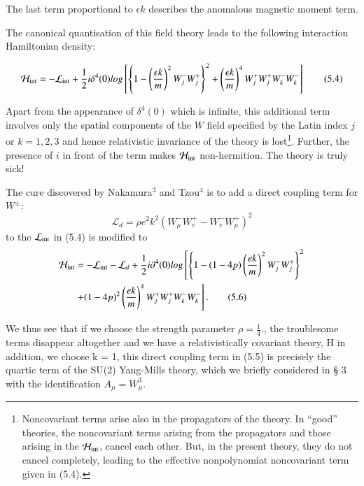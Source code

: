 The last term proportional to $\epsilon k$ describes the anomalous magnetic moment term. 

The canonical quantisation of this field theory leads to the following interaction Hamiltonian density: 

\begin{equation*}
\mathcal{H}_{\rm int} = -\mathcal{L}_{\rm int} + \frac{1}{2} i \delta^{4} (0) log\left[\left\{1 - \left(\frac{\epsilon k}{m}\right)^{2} W^{-}_{j} W^{+}_{j} \right\}^{2} + \left(\frac{\epsilon k}{m}\right)^{4} W^{+}_{j} W^{+}_{j}W^{-}_{k}W^{-}_{k}\right]\tag{5.4}
\end{equation*}

Apart from the appearance of $\delta^{4}(0)$ which is infinite, this additional term involves only the spatial
components of the $W$ field specified by the Latin index $j$ or $k = 1, 2, 3$ and hence relativistic
invariance of the theory is lost\footnote{Noncovariant terms arise also in the propagators of the theory. In “good” theories, the noncovariant terms arising from 
the propagators and those arising in the $\mathcal{H}_{\rm int}$, cancel each other. But, in the present theory, they do not cancel completely,
leading to the effective nonpolynomiat noncovariant term given in (5.4).}. Further, the presence of $i$ in front of the term makes $\mathcal{H}_{\rm int}$
non-hermition. The theory is truly sick! 

The cure discovered by Nakamura$^{3}$ and Tzou$^{4}$ is to add a direct coupling term for $W^{\pm}$: 
{\fontsize{8}{10}\selectfont
\begin{equation*}
\mathcal{L}_{d} = \rho e^{2} k^{2} (W^{-}_{\mu} W^{+}_{v} -W^{-}_{v}W^{+}_{\mu})^{2}\tag{5.5}
\end{equation*}
to the $\mathcal{L}_{\rm int}$ in (5.4) is modified to 
\begin{align*}
\mathcal{H}_{\rm int} &= - \mathcal{L}_{\rm int} - \mathcal{L}_{d} + \frac{1}{2} i \partial^{4}(0) log \left[\left\{1-(1-4p)\left(\frac{e k}{m}\right)^{2}W^{-}_{j}W^{+}_{j} \right\}^{2}\right.\\
&\left. + (1-4p)^{2} \left(\frac{ek}{m} \right)^{4}W^{+}_{j}W^{+}_{j}W^{-}_{k}W^{-}_{k} \right].\tag{5.6}
\end{align*}}

We thus see that if we choose the strength parameter $\rho = \frac{1}{4}$., the troublesome terms disappear
altogether and we have a relativistically covariant theory, H in addition, we choose k = 1, this
direct coupling term in (5.5) is precisely the quartic term of the SU(2) Yang-Mills theory, which
we briefly considered in § 3 with the identification $A_{\mu} =W^{3}_{\mu}$. 

